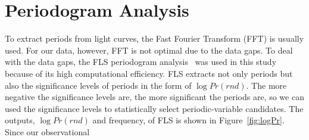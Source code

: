 \documentclass[aps,prb,twocolumn,superscriptaddress]{revtex4-1}
\begin{document}
\section{Periodogram Analysis}\label{sec:PA}

To extract periods from light curves, the Fast Fourier Transform (FFT) is usually used. For our data, however, FFT is not optimal due to the data gaps. To deal with the data gaps, the FLS periodogram analysis~\citep{Numerical, Gats} was used in this study because of its high computational efficiency. FLS extracts not only periods but also the significance levels of periods in the form of $\log{Pr(rnd)}$. The more negative the significance levels are, the more significant the periods are, so we can used the significance levels to statistically select periodic-variable candidates. The outputs, $\log{Pr(rnd)}$ and frequency, of FLS is shown in Figure~\ref{fig:logPr}. Since our observational 
\end{document}
